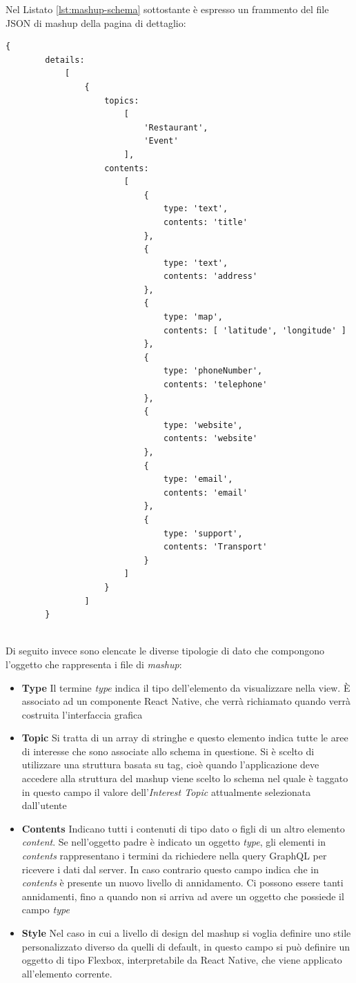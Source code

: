 Nel Listato \ref{lst:mashup-schema} sottostante è espresso un frammento del file JSON di mashup della pagina di dettaglio:
\begin{lstlisting}[backgroundcolor = \color{lightgray},
								caption = Esempio Schema Mashup,
								label = lst:mashup-schema]
	{	
		details: 
			[ 
				{ 
					topics:	
						[ 
							'Restaurant',
							'Event' 
						],
					contents: 
						[ 
							{ 
								type: 'text', 
								contents: 'title' 
							},
							{ 
								type: 'text', 
								contents: 'address'
							},
							{ 
								type: 'map', 
								contents: [ 'latitude', 'longitude' ] 
							},
							{ 
								type: 'phoneNumber', 
								contents: 'telephone' 
							},
							{ 
								type: 'website', 
								contents: 'website' 
							},
							{ 
								type: 'email',
								contents: 'email' 
							},
							{ 
								type: 'support', 
								contents: 'Transport' 
							}
						] 
					}
				]	
		}
	
\end{lstlisting}

Di seguito invece sono elencate le diverse tipologie di dato che compongono l'oggetto che rappresenta i file di \emph{mashup}:
\begin{itemize}
	\item \textbf{Type} Il termine \emph{type} indica il tipo dell'elemento da visualizzare nella view. È associato ad un componente React Native, che verrà richiamato quando verrà costruita l'interfaccia grafica
	\item \textbf{Topic} Si tratta di un array di stringhe e questo elemento indica tutte le aree di interesse che sono associate allo schema in questione. Si è scelto di utilizzare una struttura basata su tag, cioè quando l'applicazione deve accedere alla struttura del mashup viene scelto lo schema nel quale è taggato in questo campo il valore dell'\emph{Interest Topic} attualmente selezionata dall'utente
	\item \textbf{Contents} Indicano tutti i contenuti di tipo dato o figli di un altro elemento \emph{content}. Se nell'oggetto padre è indicato un oggetto \emph{type}, gli elementi in \emph{contents} rappresentano i termini da richiedere nella query GraphQL per ricevere i dati dal server. In caso contrario questo campo indica che in \emph{contents} è presente un nuovo livello di annidamento. Ci possono essere tanti annidamenti, fino a quando non si arriva ad avere un oggetto che possiede il campo \emph{type}
	\item \textbf{Style} Nel caso in cui a livello di design del mashup si voglia definire uno stile personalizzato diverso da quelli di default, in questo campo si può definire un oggetto di tipo Flexbox, interpretabile da React Native, che viene applicato all'elemento corrente. 
\end{itemize}

